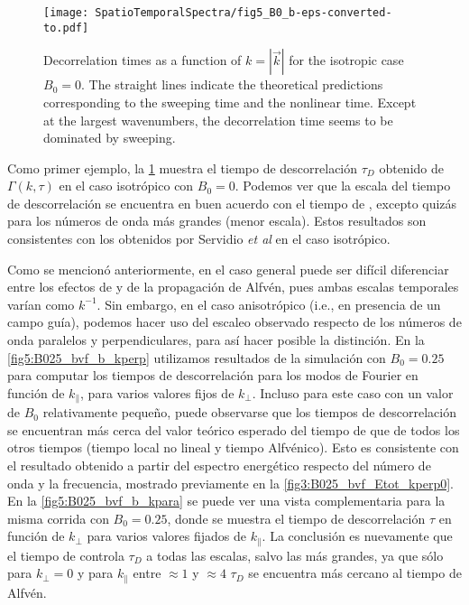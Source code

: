 \begin{figure}
  \texttt{[image: SpatioTemporalSpectra/fig5\_B0\_b-eps-converted-to.pdf]}
  \caption{Decorrelation times as a function of $k=|\vec{k}|$ for the
    isotropic case $B_0=0$. The straight lines indicate the
    theoretical predictions corresponding to the sweeping time and the
    nonlinear time. Except at the largest wavenumbers, the
    decorrelation time seems to be dominated by sweeping.}
  \label{fig5:B0_bvf_b_kpara_0}
\end{figure}

Como primer ejemplo, la \cref{fig5:B0_bvf_b_kpara_0} muestra el tiempo
de descorrelación $\tau_D$ obtenido de $\Gamma(k,\tau)$ en el caso
isotrópico con $B_0=0$.  Podemos ver que la escala del tiempo de
descorrelación se encuentra en buen acuerdo con el tiempo de
\sweeping, excepto quizás para los números de onda más grandes (menor
escala).  Estos resultados son consistentes con los obtenidos por
Servidio {\it et al} \cite{servidio_time_2011} en el caso isotrópico.

Como se mencionó anteriormente, en el caso general puede ser difícil
diferenciar entre los efectos de \sweeping y de la propagación de
Alfvén, pues ambas escalas temporales varían como $k^{-1}$. Sin
embargo, en el caso anisotrópico (i.e., en presencia de un campo
guía), podemos hacer uso del escaleo observado respecto de los números
de onda paralelos y perpendiculares, para así hacer posible la
distinción.  En la \cref{fig5:B025_bvf_b_kperp} utilizamos resultados
de la simulación con $B_0=0.25$ para computar los tiempos de
descorrelación para los modos de Fourier en función de $k_\parallel$,
para varios valores fijos de $k_\perp$. Incluso para este caso con un
valor de $B_0$ relativamente pequeño, puede observarse que los tiempos
de descorrelación se encuentran más cerca del valor teórico esperado
del tiempo de \sweeping que de todos los otros tiempos (tiempo local
no lineal y tiempo Alfvénico). Esto es consistente con el resultado
obtenido a partir del espectro energético respecto del número de onda
y la frecuencia, mostrado previamente en la
\cref{fig3:B025_bvf_Etot_kperp0}. En la \cref{fig5:B025_bvf_b_kpara}
se puede ver una vista complementaria para la misma corrida con
$B_0=0.25$, donde se muestra el tiempo de descorrelación $\tau$ en
función de $k_\perp$ para varios valores fijados de $k_\parallel$. La
conclusión es nuevamente que el tiempo de \sweeping controla $\tau_D$
a todas las escalas, salvo las más grandes, ya que sólo para
$k_\perp=0$ y para $k_\parallel$ entre $\approx 1$ y $\approx 4$
$\tau_D$ se encuentra más cercano al tiempo de Alfvén.

